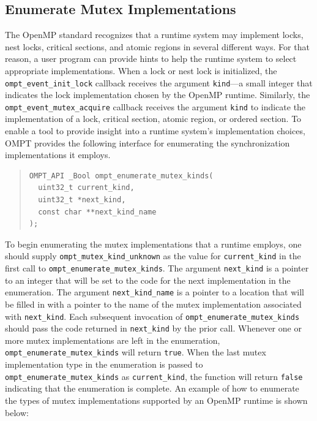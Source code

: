 \documentclass{article}
\begin{document}
 \subsection{Enumerate Mutex Implementations}
 \label{ompt_enumerate_mutex_kinds}
 
The OpenMP standard recognizes that a runtime system may implement locks, nest locks, critical sections, and atomic regions in several different ways. For that reason, a user program can provide hints to help the runtime system to select appropriate implementations.
When a lock or nest lock is initialized, the \verb|ompt_event_init_lock| callback receives the argument \verb|kind|---a small integer that indicates the lock implementation chosen by the OpenMP runtime. Similarly,  the \verb|ompt_event_mutex_acquire| callback receives the argument \verb|kind| to indicate 
the implementation of a lock, critical section, atomic region, or ordered section. To enable a tool to provide insight into a runtime system's implementation choices, OMPT provides
the following interface for enumerating the synchronization implementations it employs.

\begin{quote}
\begin{verbatim}
OMPT_API _Bool ompt_enumerate_mutex_kinds(
  uint32_t current_kind, 
  uint32_t *next_kind, 
  const char **next_kind_name
);
\end{verbatim}
\end{quote}

\noindent
\sloppy
To begin enumerating the mutex implementations that a runtime  employs, one should supply 
 \verb|ompt_mutex_kind_unknown| as the value for \verb|current_kind| in the first call to \verb|ompt_enumerate_mutex_kinds|.
The argument \verb|next_kind| is a pointer to an integer that will be set to the code for the next implementation in the enumeration.
The argument \verb|next_kind_name| is a pointer to a location that will be filled in with a pointer to the name of the mutex implementation associated with \verb|next_kind|. 
Each subsequent invocation of \verb|ompt_enumerate_mutex_kinds| should pass the code returned in \verb|next_kind| by the prior call.
Whenever one or more mutex implementations are left in the enumeration, \verb|ompt_enumerate_mutex_kinds| will return \verb|true|.
When the last mutex implementation type in the enumeration is passed to \verb|ompt_enumerate_mutex_kinds| as \verb|current_kind|, 
the function will return \verb|false| indicating that the enumeration is complete.
An example of how to enumerate the types of mutex implementations supported by an OpenMP runtime is shown below:
\end{document}
